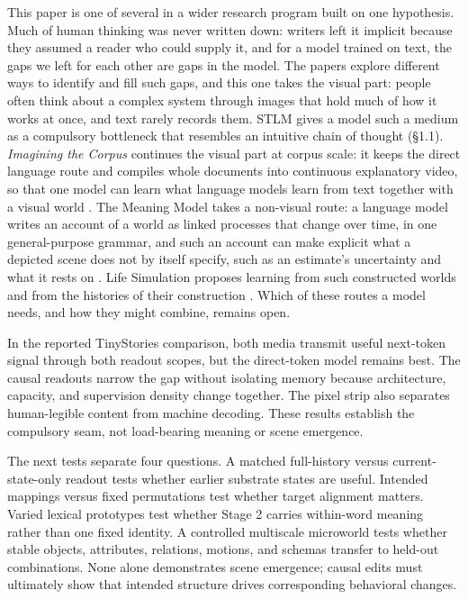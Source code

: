 \documentclass[11pt,a4paper]{article}
\begin{document}
This paper is one of several in a wider research program built on one hypothesis. Much of human thinking was never written down: writers left it implicit because they assumed a reader who could supply it, and for a model trained on text, the gaps we left for each other are gaps in the model. The papers explore different ways to identify and fill such gaps, and this one takes the visual part: people often think about a complex system through images that hold much of how it works at once, and text rarely records them. STLM gives a model such a medium as a compulsory bottleneck that resembles an intuitive chain of thought (§1.1). \emph{Imagining the Corpus} continues the visual part at corpus scale: it keeps the direct language route and compiles whole documents into continuous explanatory video, so that one model can learn what language models learn from text together with a visual world \cite{documentworld2026}. The Meaning Model takes a non-visual route: a language model writes an account of a world as linked processes that change over time, in one general-purpose grammar, and such an account can make explicit what a depicted scene does not by itself specify, such as an estimate's uncertainty and what it rests on \cite{meaningmodel2026}. Life Simulation proposes learning from such constructed worlds and from the histories of their construction \cite{lifesimulation2026}. Which of these routes a model needs, and how they might combine, remains open.

In the reported TinyStories comparison, both media transmit useful next-token signal through both readout scopes, but the direct-token model remains best. The causal readouts narrow the gap without isolating memory because architecture, capacity, and supervision density change together. The pixel strip also separates human-legible content from machine decoding. These results establish the compulsory seam, not load-bearing meaning or scene emergence.

The next tests separate four questions. A matched full-history versus current-state-only readout tests whether earlier substrate states are useful. Intended mappings versus fixed permutations test whether target alignment matters. Varied lexical prototypes test whether Stage 2 carries within-word meaning rather than one fixed identity. A controlled multiscale microworld tests whether stable objects, attributes, relations, motions, and schemas transfer to held-out combinations. None alone demonstrates scene emergence; causal edits must ultimately show that intended structure drives corresponding behavioral changes.
\end{document}
